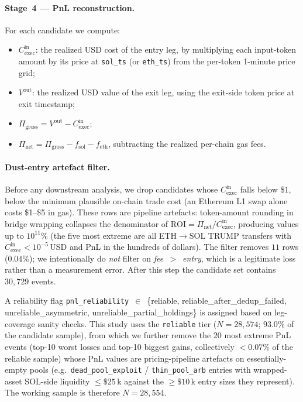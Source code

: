 \documentclass[sigconf,nonacm,10pt]{acmart}
\newcommand{\EthSol}{ETH$\to$SOL}
\newcommand{\Cexec}{C_{\text{exec}}}
\begin{document}
\paragraph{Stage~4 --- PnL reconstruction.} For each candidate we compute:
\begin{itemize}
    \item $\Cexec^{\text{in}}$: the realized USD cost of the entry leg, by
        multiplying each input-token amount by its price at
        \texttt{sol\_ts} (or \texttt{eth\_ts}) from the per-token 1-minute
        price grid;
    \item $V^{\text{out}}$: the realized USD value of the exit leg, using
        the exit-side token price at exit timestamp;
    \item $\Pi_{\text{gross}} = V^{\text{out}} - \Cexec^{\text{in}}$;
    \item $\Pi_{\text{net}} = \Pi_{\text{gross}} - f_{\text{sol}} - f_{\text{eth}}$,
        subtracting the realized per-chain gas fees.
\end{itemize}
\paragraph{Dust-entry artefact filter.} Before any downstream analysis,
we drop candidates whose $\Cexec^{\text{in}}$ falls below \$1, below the
minimum plausible on-chain trade cost (an Ethereum L1 swap alone costs
\$1--\$5 in gas). These rows are pipeline artefacts: token-amount
rounding in bridge wrapping collapses the denominator of
$\mathrm{ROI}=\Pi_{\text{net}}/\Cexec^{\text{in}}$, producing values up
to $10^{11}\%$ (the five most extreme are all \EthSol{} TRUMP transfers
with $\Cexec^{\text{in}}<\!10^{-5}$\,USD and PnL in the hundreds of
dollars). The filter removes $11$ rows ($0.04\%$); we intentionally do
\emph{not} filter on \emph{fee~$>$~entry}, which is a legitimate loss
rather than a measurement error. After this step the candidate set
contains $30{,}729$ events.

A reliability flag \texttt{pnl\_reliability}~$\in$~\{reliable, \allowbreak reliable\allowbreak\_after\allowbreak\_dedup\allowbreak\_failed, \allowbreak unreliable\allowbreak\_asymmetric, \allowbreak unreliable\allowbreak\_partial\allowbreak\_holdings\} is assigned based on leg-coverage sanity
checks. This study uses the \texttt{reliable} tier ($N=28{,}574$; $93.0\%$
of the candidate sample), from which we further remove the $20$ most
extreme PnL events (top-10 worst losses and top-10 biggest gains,
collectively $<\!0.07\%$ of the reliable sample) whose PnL values are
pricing-pipeline artefacts on essentially-empty pools (e.g.\
\texttt{dead\allowbreak\_pool\allowbreak\_exploit} /
\texttt{thin\allowbreak\_pool\allowbreak\_arb} entries with wrapped-asset
SOL-side liquidity $\leq\!\$25$\,k against the $\geq\!\$10$\,k entry
sizes they represent). The working sample is therefore $N = 28{,}554$.
\end{document}
